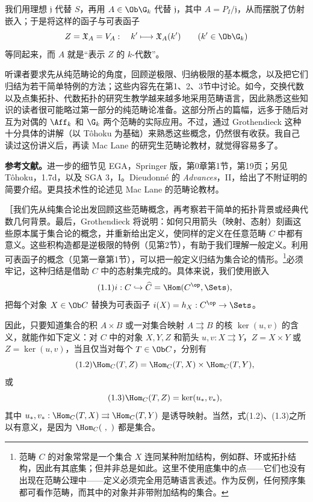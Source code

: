 我们用理想 $\mathfrak j$ 代替 $S$，再用 $A\in\Ob\G_k$ 代替 $\mathfrak j$，其中 $A=P_I/\mathfrak j$，从而摆脱了仿射嵌入；于是将这样的函子与可表函子
\[
 Z=\mathfrak X_A=V_A:\quad k'\longmapsto\mathfrak X_A(k')\qquad(k'\in\Ob\G_k)
\]
等同起来，而 $A$ 就是“表示 $Z$ 的 $k$-代数”。

听课者要求先从纯范畴论的角度，回顾逆极限、归纳极限的基本概念，以及把它们归结为若干简单特例的方法；这些内容先在第1、2、3节中讨论。如今，交换代数以及点集拓扑、代数拓扑的研究生教学越来越多地采用范畴语言，因此熟悉这些知识的读者很可能略过第一部分的纯范畴论准备。这部分所占的篇幅，远多于随后对互为对偶的 $\Aff_k$ 和 $\G_k$ 两个范畴的实际应用。不过，通过 Grothendieck 这种十分具体的讲解（以 Tôhoku 为基础）来熟悉这些概念，仍然很有收获。我自己读过这份讲义后，再读 Mac Lane 的研究生范畴论教材，就觉得容易多了。

\textbf{参考文献。}进一步的细节见 EGA，Springer 版，第0章第1节，第19页；另见 Tôhoku，1.7d，以及 SGA 3，I。Dieudonné 的 \textit{Advances}，II，给出了不附证明的简要介绍。更具技术性的论述见 Mac Lane 的范畴论教材。

［我们先从纯集合论出发回顾这些范畴概念，再考察若干简单的拓扑背景或经典代数几何背景。最后，Grothendieck 将说明：如何只用箭头（映射、态射）刻画这些原本属于集合论的概念，并重新给出定义，使同样的定义在任意范畴 $C$ 中都有意义。这些积构造都是逆极限的特例（见第2节），有助于我们理解一般定义。利用可表函子的概念（见第一章第1节），可以把一般定义归结为集合论的情形。\footnote{范畴 $C$ 的对象常常是一个集合 $X$ 连同某种附加结构，例如群、环或拓扑结构，因此有其底集；但并非总是如此。这里不使用底集中的点——它们也没有出现在范畴公理中——定义必须完全用范畴语言表述。作为反例，任何预序集都可看作范畴，而其中的对象并非带附加结构的集合。}必须牢记，这种归结是借助 $C$ 中的态射集完成的。具体来说，我们使用嵌入
\begin{equation}\tag{1.1}
 i:C\hookrightarrow\widehat C=\Hom(C^{\op},\Sets),
\end{equation}
把每个对象 $X\in\Ob C$ 替换为可表函子 $i(X)=h_X:C^{\op}\to\Sets$。

因此，只要知道集合的积 $A\times B$ 或一对集合映射 $A\rightrightarrows B$ 的核 $\ker(u,v)$ 的含义，就能作如下定义：对 $C$ 中的对象 $X,Y,Z$ 和箭头 $u,v:X\rightrightarrows Y$，$Z=X\times Y$ 或 $Z=\ker(u,v)$，当且仅当对每个 $T\in\Ob C$，分别有
\begin{equation}\tag{1.2}
 \Hom_C(T,Z)=\Hom_C(T,X)\times\Hom_C(T,Y),
\end{equation}
或
\begin{equation}\tag{1.3}
 \Hom_C(T,Z)=\ker(u_*,v_*),
\end{equation}
其中 $u_*,v_*:\Hom_C(T,X)\rightrightarrows\Hom_C(T,Y)$ 是诱导映射。当然，式(1.2)、(1.3)之所以有意义，是因为 $\Hom_C(\ ,\ )$ 都是集合。

